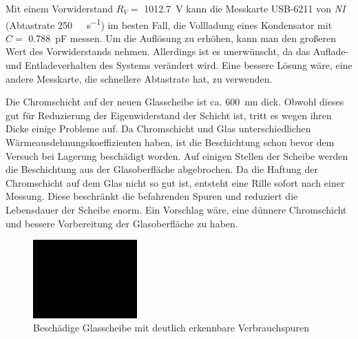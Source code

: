 Mit einem Vorwiderstand $R_V =$ \SI{1012.7}{\V} kann die Messkarte USB-6211 von \textit{NI} (Abtastrate \SI[per-mode=symbol]{250}{\kilo\sample\per\second}) im besten Fall, die Vollladung eines Kondensator mit $C =$ \SI{0.788}{\pico\farad} messen.
Um die Auflösung zu erhöhen, kann man den großeren Wert des Vorwiderstands nehmen.
Allerdings ist es unerwünscht, da das Auflade- und Entladeverhalten des Systems verändert wird.
Eine bessere Lösung wäre, eine andere Messkarte, die schnellere Abtastrate hat, zu verwenden.

Die Chromschicht auf der neuen Glasscheibe ist ca. \SI{600}{\nm} dick.
Obwohl dieses gut für Reduzierung der Eigenwiderstand der Schicht ist, tritt es wegen ihren Dicke einige Probleme auf.
Da Chromschicht und Glas unterschiedlichen Wärmeausdehnungskoeffizienten haben, ist die Beschichtung schon bevor dem Versuch bei Lagerung beschädigt worden.
Auf einigen Stellen der Scheibe werden die Beschichtung aus der Glasoberfläche abgebrochen.
Da die Haftung der Chromschicht auf dem Glas nicht so gut ist, entsteht eine Rille sofort nach einer Messung.
Diese beschränkt die befahrenden Spuren und reduziert die Lebensdauer der Scheibe enorm.
Ein Vorschlag wäre, eine dünnere Chromschicht und bessere Vorbereitung der Glasoberfläche zu haben.

\begin{figure}[htb]
    \centering
    \includegraphics[width=4cm]{./images/blank_img.jpg}
    \caption{Beschädige Glasscheibe mit deutlich erkennbare Verbrauchspuren}
    \label{fig:beschaedige_glasscheibe}
\end{figure}
